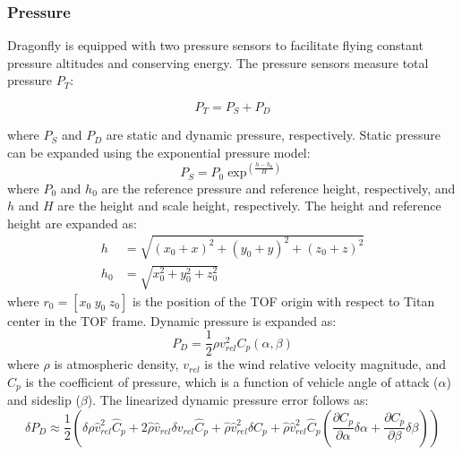 \subsubsection{Pressure} 

Dragonfly is equipped with two pressure sensors to facilitate flying constant pressure altitudes and conserving energy. The pressure sensors measure total pressure $P_{T}$: 

\begin{equation}
    P_{T} = P_{S} + P_{D}
\end{equation} \label{eq:pres}

\noindent where $P_{S}$ and $P_{D}$ are static and dynamic pressure, respectively. Static pressure can be expanded using the exponential pressure model:
\begin{equation}
    P_{S} = P_{0}\exp^{\left(\frac{h - h_{0}}{H}\right)}  
\end{equation}
\noindent where $P_{0}$ and $h_{0}$ are the reference pressure and reference height, respectively, and $h$ and $H$ are the height and scale height, respectively. The height and reference height are expanded as: 
\begin{align}
    h &= \sqrt{\left(x_{0} + x\right)^{2} + \left(y_{0} + y\right)^{2} + \left(z_{0} + z\right)^{2}} \\ 
    h_{0} &= \sqrt{x_{0}^{2} + y_{0}^{2} + z_{0}^{2}}
\end{align}
\noindent where $r_{0} = \left[x_{0} \hspace{3pt} y_{0} \hspace{3pt} z_{0}\right]$ is the position of the TOF origin with respect to Titan center in the TOF frame. Dynamic pressure is expanded as:
\begin{equation}
    P_{D} = \frac{1}{2}\rho v_{rel}^2 C_{p}\left(\alpha, \beta\right)   
\end{equation}
\noindent where $\rho$ is atmospheric density, $v_{rel}$ is the wind relative velocity magnitude, and $C_{p}$ is the coefficient of pressure, which is a function of vehicle angle of attack ($\alpha$) and sideslip ($\beta$). The linearized dynamic pressure error follows as:
\begin{equation} \label{eq:pderr}
    \delta P_{D} \approx \frac{1}{2}\left( \delta \rho \hat{v}_{rel}^2 \hat{C}_{p} + 2\hat{\rho} \hat{v}_{rel} \delta v_{rel} \hat{C}_{p} + \hat{\rho} \hat{v}_{rel}^2 \delta C_{p} + \hat{\rho} \hat{v}_{rel}^2 \hat{C}_{p}\left(\frac{\partial C_{p}}{\partial \alpha} \delta \alpha +  \frac{\partial C_{p}}{\partial \beta} \delta \beta\right)\right)
\end{equation} 

